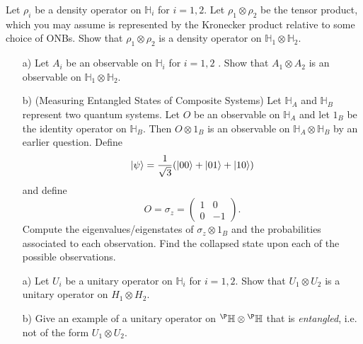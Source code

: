 \documentclass{article}
\renewcommand{\H}{\mathbb{H}}
\begin{document}
\begin{question}
    Let $\rho_i$ be a density operator on $\H_i$ for $i=1,2.$ Let $\rho_1 \otimes \rho_2$ be the tensor product, which you may assume is represented by the Kronecker product relative to some choice of ONBs. Show that $\rho_1 \otimes \rho_2$ is a density operator on $\H_1 \otimes \H_2$.
\end{question}

\begin{question}
    \begin{enumerate}
        \item[a)] Let $A_i$ be an observable on $\H_i$ for $i=1,2$ . Show that $A_1 \otimes A_2$ is an observable on $\H_1 \otimes \H_2.$
        \item[b)] (Measuring Entangled States of Composite Systems) Let $\H_A$ and $\H_B$ represent two quantum systems. Let $O$ be an observable on $\H_A$ and let $1_B$ be the identity operator on $\H_B$. Then $O \otimes 1_B$ is an observable on $\H_A \otimes \H_B$ by an earlier question. Define $$\ket{\psi}=\frac{1}{\sqrt{3}}(\ket{00}+\ket{01}+\ket{10})$$ and define $$O=\sigma_z=\begin{pmatrix}
            1 & 0\\
            0 & -1
        \end{pmatrix}.$$ Compute the eigenvalues/eigenstates of $\sigma_z \otimes 1_B$ and the probabilities associated to each observation. Find the collapsed state upon each of the possible observations.
    \end{enumerate}
\end{question}

\begin{question}
    \begin{enumerate}
        \item[a)] Let $U_i$ be a unitary operator on $\H_i$ for $i=1,2.$ Show that $U_1 \otimes U_2$ is a unitary operator on $H_1 \otimes H_2$.
        \item[b)] Give an example of a unitary operator on ${}^\P\H \otimes {}^\P\H $ that is \textit{entangled}, i.e. not of the form $U_1 \otimes U_2.$ 
    \end{enumerate}
\end{question}
\end{document}
